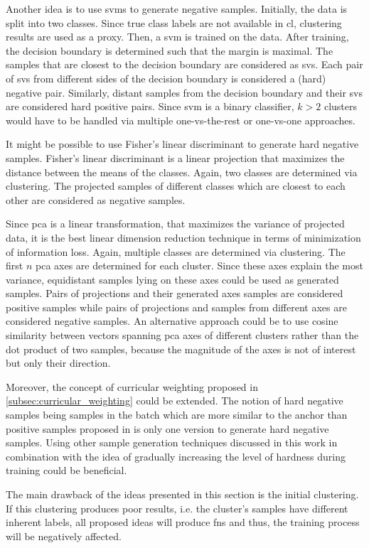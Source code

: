 Another idea is to use \acp{svm} to generate negative samples.
Initially, the data is split into two classes. 
Since true class labels are not available in \ac{cl}, clustering results are used as a proxy.
Then, a \ac{svm} is trained on the data.
After training, the decision boundary is determined such that the margin is maximal.
The samples that are closest to the decision boundary are considered as \acp{sv}.
Each pair of \acp{sv} from different sides of the decision boundary is considered a (hard) negative pair.
Similarly, distant samples from the decision boundary and their \acp{sv} are considered hard positive pairs.
Since \ac{svm} is a binary classifier, $k>2$ clusters would have to be handled via
multiple one-vs-the-rest or one-vs-one approaches.

It might be possible to use Fisher's linear discriminant to generate hard negative samples.
Fisher's linear discriminant is a linear projection that maximizes the distance between the means of the classes.
Again, two classes are determined via clustering.
The projected samples of different classes which are closest to each other are considered as negative samples.

Since \ac{pca} is a linear transformation, that maximizes the variance of projected data, 
it is the best linear dimension reduction technique in terms of minimization of information loss.
Again, multiple classes are determined via clustering.
The first $n$ \ac{pca} axes are determined for each cluster.
Since these axes explain the most variance, equidistant samples lying on these axes could be used as generated samples.
Pairs of projections and their generated axes samples are considered positive samples while 
pairs of projections and samples from different axes are considered negative samples.
An alternative approach could be to use cosine similarity between vectors spanning \ac{pca} axes of different clusters 
rather than the dot product of two samples, 
because the magnitude of the axes is not of interest but only their direction.

Moreover, the concept of curricular weighting proposed in \autoref{subsec:curricular_weighting} could be extended.
The notion of hard negative samples being samples in the batch which are more similar to the anchor than positive samples 
proposed in \citet{curricular_weighting_2024} is only one version to generate hard negative samples.
Using other sample generation techniques discussed in this work in combination with 
the idea of gradually increasing the level of hardness during training could be beneficial.

The main drawback of the ideas presented in this section is the initial clustering.
If this clustering produces poor results, i.e. the cluster's samples have different inherent labels, 
all proposed ideas will produce \acp{fn} and thus, the training process will be negatively affected.